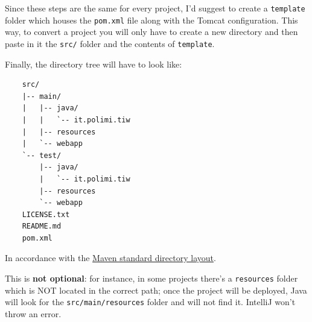 \begin{tip}{}
  Since these steps are the same for every project, I'd suggest to create a \texttt{template} folder which houses the \texttt{pom.xml} file along with the Tomcat configuration. This way, to convert a project you will only have to create a new directory and then paste in it the \texttt{src/} folder and the contents of \texttt{template}.
\end{tip}

\begin{warning}{}
  Finally, the directory tree will have to look like:
  \begin{verbatim}
    src/
    |-- main/
    |   |-- java/
    |   |   `-- it.polimi.tiw
    |   |-- resources
    |   `-- webapp
    `-- test/
        |-- java/
        |   `-- it.polimi.tiw
        |-- resources
        `-- webapp
    LICENSE.txt
    README.md
    pom.xml
  \end{verbatim}

  In accordance with the \href{https://maven.apache.org/guides/introduction/introduction-to-the-standard-directory-layout.html}{Maven standard directory layout}.

  This is \textbf{not optional}: for instance, in some projects there's a \texttt{resources} folder which is NOT located in the correct path; once the project will be deployed, Java will look for the \texttt{src/main/resources} folder and will not find it. IntelliJ won't throw an error.
\end{warning}
